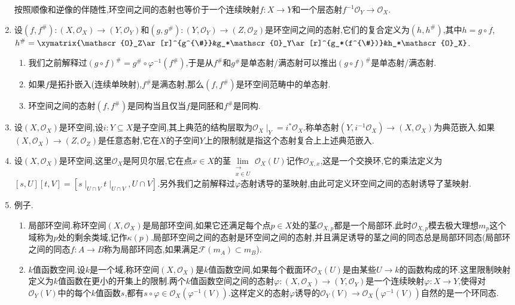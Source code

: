 \begin{enumerate}
	按照顺像和逆像的伴随性,环空间之间的态射也等价于一个连续映射$f:X\to Y$和一个层态射$f^{-1}\mathscr{O}_Y\to\mathscr{O}_X$.
	\item 设$(f,f^{\#}):(X,\mathscr{O}_X)\to(Y,\mathscr{O}_Y)$和$(g,g^{\#}):(Y,\mathscr{O}_Y)\to(Z,\mathscr{O}_Z)$是环空间之间的态射,它们的复合定义为$(h,h^{\#})$,其中$h=g\circ f$,$h^{\#}=\xymatrix{\mathscr{O}_Z\ar[r]^{g^{\#}}&g_*\mathscr{O}_Y\ar[r]^{g_*(f^{\#})}&h_*\mathscr{O}_X}$.
	\begin{enumerate}[(1)]
		\item 我们之前解释过$(g\circ f)^{\#}=g^{\#}\circ\varphi^{-1}(f^{\#})$,于是从$f^{\#}$和$g^{\#}$是单态射/满态射可以推出$(g\circ f)^{\#}$是单态射/满态射.
		\item 如果$f$是拓扑嵌入(连续单映射),$f^{\#}$是满态射,那么$(f,f^{\#})$是环空间范畴中的单态射.
		\item 环空间之间的态射$(f,f^{\#})$是同构当且仅当$f$是同胚和$f^{\#}$是同构.
	\end{enumerate}
	\item 设$(X,\mathscr{O}_X)$是环空间,设$i:Y\subseteq X$是子空间,其上典范的结构层取为$\mathscr{O}_X\mid_Y=i^*\mathscr{O}_X$.称单态射$(Y,i^{-1}\mathscr{O}_X)\to(X,\mathscr{O}_X)$为典范嵌入.如果$(X,\mathscr{O}_X)\to(Z,\mathscr{O}_Z)$是任意态射,它在$X$的子空间$Y$上的限制就是指这个态射复合上上述典范嵌入.
	\item 设$(X,\mathscr{O}_X)$是环空间,这里$\mathscr{O}_X$是阿贝尔层,它在点$x\in X$的茎$\lim\limits_{\substack{\rightarrow\\x\in U}}\mathscr{O}_X(U)$记作$\mathscr{O}_{X,x}$,这是一个交换环,它的乘法定义为$[s,U][t,V]=[s\mid_{U\cap V}t\mid_{U\cap V},U\cap V]$.另外我们之前解释过$\varphi$态射诱导的茎映射,由此可定义环空间之间的态射诱导了茎映射.
	\item 例子.
	\begin{enumerate}[(1)]
		\item 局部环空间.称环空间$(X,\mathscr{O}_X)$是局部环空间,如果它还满足每个点$p\in X$处的茎$\mathscr{O}_{X,p}$都是一个局部环.此时$\mathscr{O}_{X,p}$模去极大理想$m_p$这个域称为$p$处的剩余类域,记作$\kappa(p)$.局部环空间之间的态射是环空间之间的态射,并且满足诱导的茎之间的同态总是局部环同态(局部环之间的同态$f:A\to B$称为局部环同态,如果满足$\mathscr{F}(m_A)\subset m_B$).
		\item $k$值函数空间.设$k$是一个域,称环空间$(X,\mathscr{O}_X)$是$k$值函数空间,如果每个截面环$\mathscr{O}_X(U)$是由某些$U\to k$的函数构成的环.这里限制映射定义为$k$值函数在更小的开集上的限制.两个$k$值函数空间之间的态射$\varphi:(X,\mathscr{O}_X)\to(Y,\mathscr{O}_Y)$是一个连续映射$\varphi:X\to Y$,使得对$\mathscr{O}_Y(V)$中的每个$k$值函数$s$,都有$s\circ\varphi\in\mathscr{O}_X(\varphi^{-1}(V))$.这样定义的态射$\varphi$诱导的$\mathscr{O}_Y(V)\to\mathscr{O}_X(\varphi^{-1}(V))$自然的是一个环同态.

\end{enumerate}
\end{enumerate}
